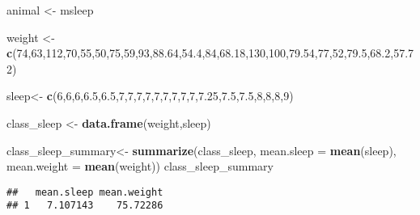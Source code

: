 \documentclass[]{article}
\newenvironment{Shaded}{\begin{snugshade}}{\end{snugshade}}
\newcommand{\KeywordTok}[1]{\textcolor[rgb]{0.13,0.29,0.53}{\textbf{#1}}}
\newcommand{\DataTypeTok}[1]{\textcolor[rgb]{0.13,0.29,0.53}{#1}}
\newcommand{\DecValTok}[1]{\textcolor[rgb]{0.00,0.00,0.81}{#1}}
\newcommand{\FloatTok}[1]{\textcolor[rgb]{0.00,0.00,0.81}{#1}}
\newcommand{\StringTok}[1]{\textcolor[rgb]{0.31,0.60,0.02}{#1}}
\newcommand{\NormalTok}[1]{#1}
\begin{document}
\begin{Shaded}
\begin{Highlighting}[]
\NormalTok{animal <-}\StringTok{ }\NormalTok{msleep}

\NormalTok{weight <-}\StringTok{ }\KeywordTok{c}\NormalTok{(}\DecValTok{74}\NormalTok{,}\DecValTok{63}\NormalTok{,}\DecValTok{112}\NormalTok{,}\DecValTok{70}\NormalTok{,}\DecValTok{55}\NormalTok{,}\DecValTok{50}\NormalTok{,}\DecValTok{75}\NormalTok{,}\DecValTok{59}\NormalTok{,}\DecValTok{93}\NormalTok{,}\FloatTok{88.64}\NormalTok{,}\FloatTok{54.4}\NormalTok{,}\DecValTok{84}\NormalTok{,}\FloatTok{68.18}\NormalTok{,}\DecValTok{130}\NormalTok{,}\DecValTok{100}\NormalTok{,}\FloatTok{79.54}\NormalTok{,}\DecValTok{77}\NormalTok{,}\DecValTok{52}\NormalTok{,}\FloatTok{79.5}\NormalTok{,}\FloatTok{68.2}\NormalTok{,}\FloatTok{57.72}\NormalTok{)}

\NormalTok{sleep<-}\StringTok{ }\KeywordTok{c}\NormalTok{(}\DecValTok{6}\NormalTok{,}\DecValTok{6}\NormalTok{,}\DecValTok{6}\NormalTok{,}\FloatTok{6.5}\NormalTok{,}\FloatTok{6.5}\NormalTok{,}\DecValTok{7}\NormalTok{,}\DecValTok{7}\NormalTok{,}\DecValTok{7}\NormalTok{,}\DecValTok{7}\NormalTok{,}\DecValTok{7}\NormalTok{,}\DecValTok{7}\NormalTok{,}\DecValTok{7}\NormalTok{,}\DecValTok{7}\NormalTok{,}\DecValTok{7}\NormalTok{,}\FloatTok{7.25}\NormalTok{,}\FloatTok{7.5}\NormalTok{,}\FloatTok{7.5}\NormalTok{,}\DecValTok{8}\NormalTok{,}\DecValTok{8}\NormalTok{,}\DecValTok{8}\NormalTok{,}\DecValTok{9}\NormalTok{)}

\NormalTok{class_sleep <-}\StringTok{ }\KeywordTok{data.frame}\NormalTok{(weight,sleep)}

\NormalTok{class_sleep_summary<-}\StringTok{ }\KeywordTok{summarize}\NormalTok{(class_sleep,}
                                \DataTypeTok{mean.sleep =} \KeywordTok{mean}\NormalTok{(sleep),}
                                \DataTypeTok{mean.weight =} \KeywordTok{mean}\NormalTok{(weight))}
\NormalTok{class_sleep_summary}
\end{Highlighting}
\end{Shaded}

\begin{verbatim}
##   mean.sleep mean.weight
## 1   7.107143    75.72286
\end{verbatim}
\end{document}
